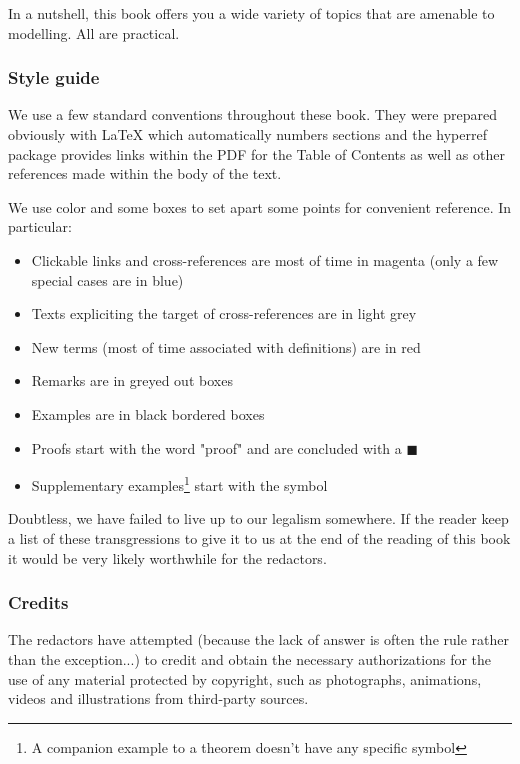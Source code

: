 	In a nutshell, this book offers you a wide variety of topics that are amenable to modelling. All are practical.
	
	\subsubsection{Style guide}
	We use a few standard conventions throughout these book. They were prepared  obviously with \LaTeX{} which automatically numbers sections and the hyperref package provides links within the PDF for the Table of Contents as well as other references made within the body of the text.

	We use color and some boxes to set apart some points for convenient reference. In particular:
	\begin{itemize}
		\item Clickable links and cross-references are most of time in magenta (only a few special cases are in blue)
		
		\item Texts expliciting the target of cross-references are in light grey 
		
		\item New terms (most of time associated with definitions) are in red
		
		\item Remarks are in greyed out boxes
		
		\item Examples are in black bordered boxes
		
		\item Proofs start with the word "proof" and are concluded with a $\blacksquare$
		
		\item Supplementary examples\footnote{A companion example to a theorem doesn't have any specific symbol} start with the symbol {\Large {}}
	\end{itemize}
	Doubtless, we have failed to live up to our legalism somewhere. If the reader keep a list of these transgressions to give it to us at the end of the reading of this book it would be very likely worthwhile for the redactors.
	
	\subsubsection{Credits}
	The redactors have attempted (because the lack of answer is often the rule rather than the exception...) to credit and obtain the necessary authorizations for the use of any material protected by copyright, such as photographs, animations, videos and illustrations from third-party sources.

